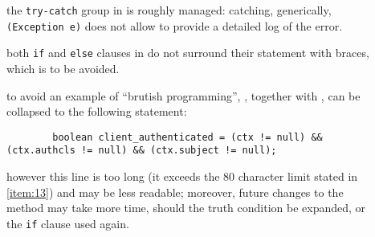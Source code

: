 
\begin{description}
	
	\item []
		the \verb|try-catch| group in  is roughly managed: catching, generically, \verb|(Exception e)| does not allow to provide a detailed log of the error.
\end{description}



\begin{description}
	
	\item [] 
		both \verb|if| and \verb|else| clauses in  do not surround their statement with braces, which is to be avoided.
	
	\item []
		to avoid an example of ``brutish programming'', , together with , can be collapsed to the following statement: 
		\begin{verbatim}
		boolean client_authenticated = (ctx != null) && (ctx.authcls != null) && (ctx.subject != null);
		\end{verbatim}
		however this line is too long (it exceeds the 80 character limit stated in \cref{item:13}) and may be less readable; moreover, future changes to the method may take more time, should the truth condition be expanded, or the \verb|if| clause used again.
\end{description}


